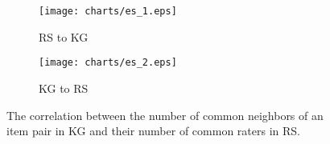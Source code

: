 \documentclass[sigconf]{acmart}
\begin{document}
		\begin{figure}[t]
			\centering
            \begin{subfigure}[b]{0.23\textwidth}
                \texttt{[image: charts/es\_1.eps]}
                \caption{RS to KG}
                \label{fig:case_study_1}
            \end{subfigure}
            \hfill
            \begin{subfigure}[b]{0.23\textwidth}
                \texttt{[image: charts/es\_2.eps]}
                \caption{KG to RS}
                \label{fig:case_study_2}
            \end{subfigure}
            \caption{The correlation between the number of common neighbors of an item pair in KG and their number of common raters in RS.}
        \end{figure}
        
\end{document}
